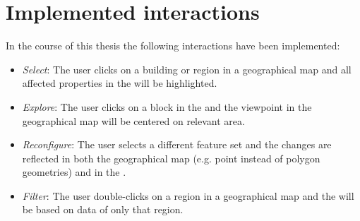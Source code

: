\section{Implemented interactions}

In the course of this thesis the following interactions have been implemented:
\begin{itemize}
  \item
    \emph{Select}: The user clicks on a building or region in a geographical map and all affected properties in the \tmap{} will be highlighted.
  \item
    \emph{Explore}: The user clicks on a block in the \tmap{} and the viewpoint in the geographical map will be centered on relevant area.
  \item
    \emph{Reconfigure}: The user selects a different feature set and the changes are reflected in both the geographical map (e.g. point instead of polygon geometries) and in the \tmap{}.
  \item
    \emph{Filter}: The user double-clicks on a region in a geographical map and the \tmap{} will be based on data of only that region.
\end{itemize}
